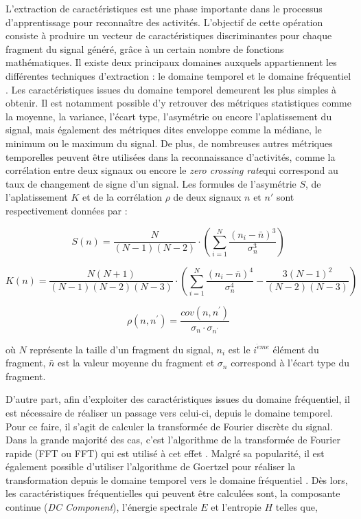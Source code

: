 L'extraction de caractéristiques est une phase importante dans le processus d'apprentissage pour reconnaître des activités. L'objectif de cette opération consiste à produire un vecteur de caractéristiques discriminantes pour chaque fragment du signal généré, grâce à un certain nombre de fonctions mathématiques. Il existe deux principaux domaines auxquels appartiennent les différentes techniques d'extraction : le domaine temporel et le domaine fréquentiel \citep{Huynh2005, Figo2010, Cleland2013}. Les caractéristiques issues du domaine temporel demeurent les plus simples à obtenir. Il est notamment possible d'y retrouver des métriques statistiques comme la moyenne, la variance, l'écart type, l'asymétrie ou encore l'aplatissement du signal, mais également des métriques dites \og enveloppe \fg comme la médiane, le minimum ou le maximum du signal. De plus, de nombreuses autres métriques temporelles peuvent être utilisées dans la reconnaissance d'activités, comme la corrélation entre deux signaux ou encore le \textit{zero crossing rate}\textemdash qui correspond au taux de changement de signe d'un signal. Les formules de l'asymétrie $S$, de l'aplatissement $K$ et de la corrélation $\rho$ de deux signaux $n \mbox{ et } n'$ sont respectivement données par :

\begin{equation}
	\label{eq:asymetrie}
	S \left(n\right) = \frac{N}{(N-1)(N-2)} \cdot \left(\sum_{i=1}^{N}{\frac{(n_i-\bar{n})^3}{\sigma_n^3}}\right)
\end{equation}

\begin{equation}
	\label{eq:kurtosis}
	K \left(n\right) = \frac{N(N+1)}{(N-1)(N-2)(N-3)} \cdot \left(\sum_{i=1}^{N}{\frac{(n_i-\bar{n})^4}{\sigma_n^4}-\frac{3(N-1)^2}{(N-2)(N-3)}}\right)
\end{equation}

\begin{equation}
	\label{eq:correlation}
	\rho\left(n, n^{\prime}\right) = \frac{cov\left(n, n^{\prime}\right)}{\sigma_n\cdot\sigma_{n^{\prime}}}
\end{equation}

\noindent où $N$ représente la taille d'un fragment du signal, $n_i$ est le $i^{\grave{e}me}$ élément du fragment, $\bar{n}$ est la valeur moyenne du fragment et $\sigma_n$ correspond à l'écart type du fragment.

D'autre part, afin d'exploiter des caractéristiques issues du domaine fréquentiel, il est nécessaire de réaliser un passage vers celui-ci, depuis le domaine temporel. Pour ce faire, il s'agit de calculer la transformée de Fourier discrète du signal. Dans la grande majorité des cas, c'est l'algorithme de la transformée de Fourier rapide (\acl{FFT} ou \acs{FFT}) qui est utilisé à cet effet \citep{Brigham1967}. Malgré sa popularité, il est également possible d'utiliser l'algorithme de Goertzel pour réaliser la transformation depuis le domaine temporel vers le domaine fréquentiel \citep{Sysel2012}. Dès lors, les caractéristiques fréquentielles qui peuvent être calculées sont, la composante continue (\textit{DC Component}), l'énergie spectrale $E$ et l'entropie $H$ telles que,

